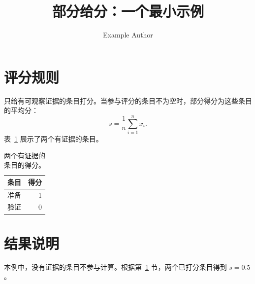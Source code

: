 \documentclass[twocolumn]{article}
\title{部分给分：一个最小示例}
\author{Example Author}
\date{}
\begin{document}
\maketitle
\section{评分规则}\label{sec:rule}
只给有可观察证据的条目打分。当参与评分的条目不为空时，部分得分为这些条目的平均分：
\begin{equation}
  s = \frac{1}{n}\sum_{i=1}^{n} x_i .
\end{equation}
表~\ref{tab:example} 展示了两个有证据的条目。
\begin{table}[h]
\centering
\caption{两个有证据的条目的得分。}\label{tab:example}
\begin{tabular}{lr}
条目 & 得分\\\hline
准备 & 1\\
验证 & 0\\
\end{tabular}
\end{table}
\section{结果说明}
本例中，没有证据的条目不参与计算。根据第~\ref{sec:rule} 节，两个已打分条目得到 $s=0.5$。
\end{document}
